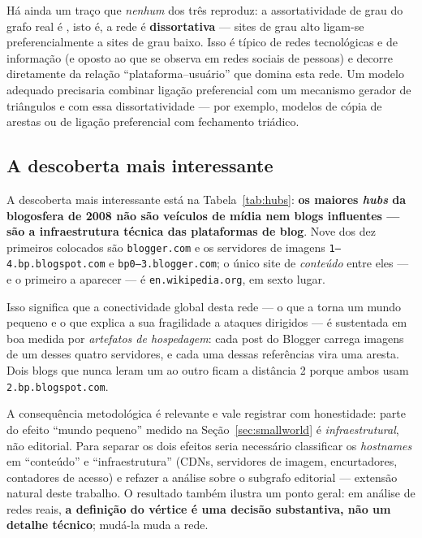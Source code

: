 \documentclass[sigconf]{webmedia}
\begin{document}
Há ainda um traço que \emph{nenhum} dos três reproduz: a assortatividade de
grau do grafo real é \modRealAssort{}, isto é, a rede é
\textbf{dissortativa} --- sites de grau alto ligam-se preferencialmente a
sites de grau baixo. Isso é típico de redes tecnológicas e de informação
(e oposto ao que se observa em redes sociais de pessoas) e decorre
diretamente da relação ``plataforma--usuário'' que domina esta rede.
Um modelo adequado precisaria combinar ligação preferencial com um
mecanismo gerador de triângulos e com essa dissortatividade --- por
exemplo, modelos de cópia de arestas ou de ligação preferencial com
fechamento triádico.

\subsection{A descoberta mais interessante}
\label{sec:descoberta}

A descoberta mais interessante está na Tabela~\ref{tab:hubs}:
\textbf{os maiores \textit{hubs} da blogosfera de 2008 não são veículos de
mídia nem blogs influentes --- são a infraestrutura técnica das
plataformas de blog}. Nove dos dez primeiros colocados são
\texttt{blogger.com} e os servidores de imagens
\texttt{1--4.bp.blogspot.com} e \texttt{bp0--3.blogger.com}; o único site
de \emph{conteúdo} entre eles --- e o primeiro a aparecer --- é
\texttt{en.wikipedia.org}, em sexto lugar.

Isso significa que a conectividade global desta rede --- o que a torna um
mundo pequeno e o que explica a sua fragilidade a ataques dirigidos --- é
sustentada em boa medida por \emph{artefatos de hospedagem}: cada post do
Blogger carrega imagens de um desses quatro servidores, e cada uma dessas
referências vira uma aresta. Dois blogs que nunca leram um ao outro ficam
a distância 2 porque ambos usam \texttt{2.bp.blogspot.com}.

A consequência metodológica é relevante e vale registrar com honestidade:
parte do efeito ``mundo pequeno'' medido na Seção~\ref{sec:smallworld} é
\emph{infraestrutural}, não editorial. Para separar os dois efeitos seria
necessário classificar os \textit{hostnames} em ``conteúdo'' e
``infraestrutura'' (CDNs, servidores de imagem, encurtadores, contadores de
acesso) e refazer a análise sobre o subgrafo editorial --- extensão
natural deste trabalho. O resultado também ilustra um ponto geral: em
análise de redes reais, \textbf{a definição do vértice é uma decisão
substantiva, não um detalhe técnico}; mudá-la muda a rede.
\end{document}

